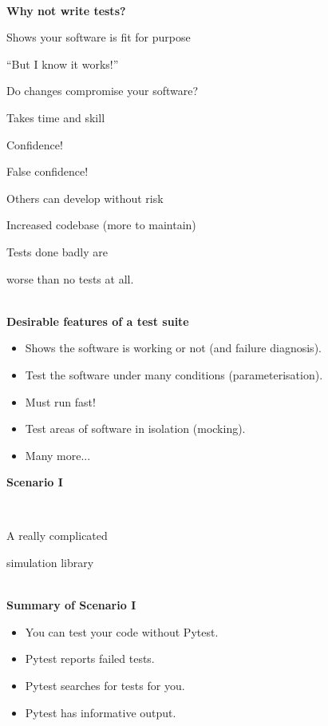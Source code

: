 \documentclass[12pt]{article}
\newlength{\geometrytop}
\newcommand{\slidetitle}[1]{~\\[-0.5ex]{\Large\bf{\color{bold}#1}}\\}
\begin{document}
\slidetitle{Why {\color{red}not} write tests?}
\begin{itemize}[itemsep=-2.9pt]
\item Shows your software is fit for purpose
{\color{red} \item[] \hfill ``But I know it works!''}
\item Do changes compromise your software?
{\color{red} \item[] \hfill Takes time and skill}
\item Confidence!
{\color{red} \item[] \hfill False confidence!}
\item Others can develop without risk
{\color{red} \item[] \hfill Increased codebase (more to maintain)}
\end{itemize}
\clearpage

\thispagestyle{plain}
\vspace*{-\topskip}
\vspace*{\fill}
{\LARGE\centerline{Tests done badly are}
\centerline{worse than no tests at all.}}
\vspace*{\fill}
\vspace*{\geometrytop}
\clearpage


\slidetitle{Desirable features of a test suite}
\begin{itemize}
\item Shows the software is working or not (and failure diagnosis).
\item Test the software under many conditions (parameterisation).
\item Must run fast!
\item Test areas of software in isolation (mocking).
\item Many more...
\end{itemize}
\clearpage

\thispagestyle{plain}
\vspace*{-\topskip}
\vspace*{\fill}
{\Huge\centerline{\textbf{Scenario I}}~\newline
\centerline{A really complicated}
\centerline{simulation library}}
\vspace*{\fill}
\vspace*{\geometrytop}
\clearpage

\slidetitle{Summary of Scenario I}
\begin{itemize}
\item You can test your code without Pytest.
\item Pytest reports failed tests.
\item Pytest searches for tests for you.
\item Pytest has informative output.
\end{itemize}
\clearpage
\end{document}
